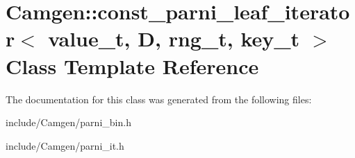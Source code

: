 \hypertarget{a00098}{}\section{Camgen\+:\+:const\+\_\+parni\+\_\+leaf\+\_\+iterator$<$ value\+\_\+t, D, rng\+\_\+t, key\+\_\+t $>$ Class Template Reference}
\label{a00098}


The documentation for this class was generated from the following files\+:\begin{DoxyCompactItemize}
\item 
include/\+Camgen/parni\+\_\+bin.\+h\item 
include/\+Camgen/parni\+\_\+it.\+h\end{DoxyCompactItemize}
